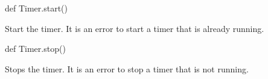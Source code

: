 \begin{protohead}
def Timer.start()
\end{protohead}
\begin{protobody}
Start the timer.  It is an error to start a timer that is already
running.
\end{protobody}

\begin{protohead}
def Timer.stop()
\end{protohead}
\begin{protobody}
Stops the timer.  It is an error to stop a timer that is not running.
\end{protobody}
